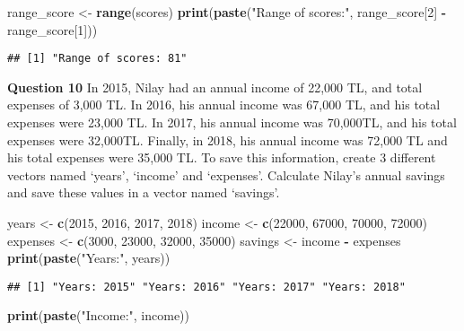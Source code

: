 \documentclass[
]{article}
\newenvironment{Shaded}{\begin{snugshade}}{\end{snugshade}}
\newcommand{\DecValTok}[1]{\textcolor[rgb]{0.00,0.00,0.81}{#1}}
\newcommand{\KeywordTok}[1]{\textcolor[rgb]{0.13,0.29,0.53}{\textbf{#1}}}
\newcommand{\NormalTok}[1]{#1}
\newcommand{\OperatorTok}[1]{\textcolor[rgb]{0.81,0.36,0.00}{\textbf{#1}}}
\newcommand{\StringTok}[1]{\textcolor[rgb]{0.31,0.60,0.02}{#1}}
\begin{document}
\begin{Shaded}
\begin{Highlighting}[]
\NormalTok{range_score <-}\StringTok{ }\KeywordTok{range}\NormalTok{(scores)}
\KeywordTok{print}\NormalTok{(}\KeywordTok{paste}\NormalTok{(}\StringTok{"Range of scores:"}\NormalTok{, range_score[}\DecValTok{2}\NormalTok{] }\OperatorTok{-}\StringTok{ }\NormalTok{range_score[}\DecValTok{1}\NormalTok{]))}
\end{Highlighting}
\end{Shaded}

\begin{verbatim}
## [1] "Range of scores: 81"
\end{verbatim}

\textbf{Question 10} In 2015, Nilay had an annual income of 22,000 TL,
and total expenses of 3,000 TL. In 2016, his annual income was 67,000
TL, and his total expenses were 23,000 TL. In 2017, his annual income
was 70,000TL, and his total expenses were 32,000TL. Finally, in 2018,
his annual income was 72,000 TL and his total expenses were 35,000 TL.
To save this information, create 3 different vectors named `years',
`income' and `expenses'. Calculate Nilay's annual savings and save these
values in a vector named `savings'.

\begin{Shaded}
\begin{Highlighting}[]
\NormalTok{years <-}\StringTok{ }\KeywordTok{c}\NormalTok{(}\DecValTok{2015}\NormalTok{, }\DecValTok{2016}\NormalTok{, }\DecValTok{2017}\NormalTok{, }\DecValTok{2018}\NormalTok{)}
\NormalTok{income <-}\StringTok{ }\KeywordTok{c}\NormalTok{(}\DecValTok{22000}\NormalTok{, }\DecValTok{67000}\NormalTok{, }\DecValTok{70000}\NormalTok{, }\DecValTok{72000}\NormalTok{)}
\NormalTok{expenses <-}\StringTok{ }\KeywordTok{c}\NormalTok{(}\DecValTok{3000}\NormalTok{, }\DecValTok{23000}\NormalTok{, }\DecValTok{32000}\NormalTok{, }\DecValTok{35000}\NormalTok{)}
\NormalTok{savings <-}\StringTok{ }\NormalTok{income }\OperatorTok{-}\StringTok{ }\NormalTok{expenses}
\KeywordTok{print}\NormalTok{(}\KeywordTok{paste}\NormalTok{(}\StringTok{"Years:"}\NormalTok{, years))}
\end{Highlighting}
\end{Shaded}

\begin{verbatim}
## [1] "Years: 2015" "Years: 2016" "Years: 2017" "Years: 2018"
\end{verbatim}

\begin{Shaded}
\begin{Highlighting}[]
\KeywordTok{print}\NormalTok{(}\KeywordTok{paste}\NormalTok{(}\StringTok{"Income:"}\NormalTok{, income))}
\end{Highlighting}
\end{Shaded}
\end{document}
